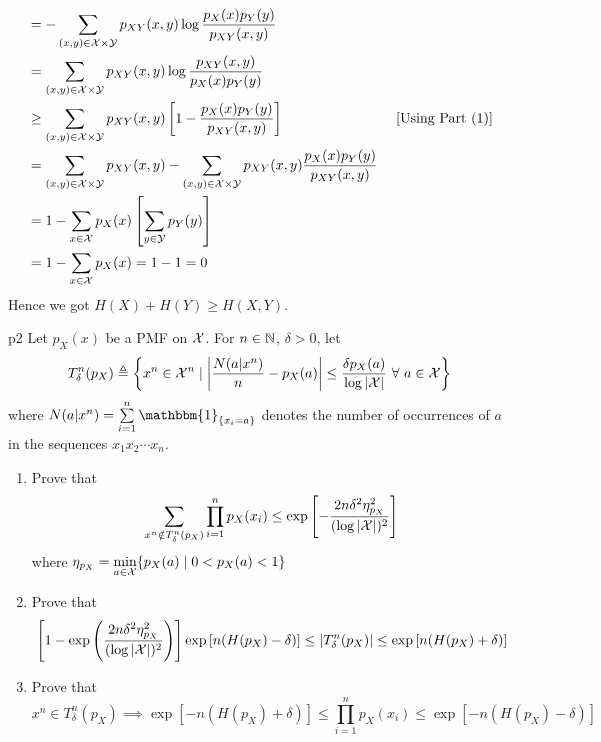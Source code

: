\documentclass[a4paper, 11pt]{article}
\begin{document}
{\begin{enumerate}
\begin{align*}
		                 & = -\sum_{(x,y)\in \mathcal{X}\times \mathcal{Y}}p_{XY}(x,y)\log \frac{p_X(x)p_Y(y)}{p_{XY}(x,y)}                                                                 \\
		                 & = \sum_{(x,y)\in \mathcal{X}\times \mathcal{Y}}p_{XY}(x,y)\log \frac{p_{XY}(x,y)}{p_X(x)p_Y(y)}                                                                  \\
		                 & \geq \sum_{(x,y)\in \mathcal{X}\times \mathcal{Y}}p_{XY}(x,y)\left[ 1-\frac{p_X(x)p_Y(y)}{p_{XY}(x,y)} \right] \qquad\qquad\qquad\qquad \left[\text{Using Part (1)}\right] \\
		                 & = \sum_{(x,y)\in \mathcal{X}\times \mathcal{Y}}p_{XY}(x,y) - \sum_{(x,y)\in \mathcal{X}\times \mathcal{Y}}p_{XY}(x,y)\frac{p_X(x)p_Y(y)}{p_{XY}(x,y)}                          \\
		                 & = 1-\sum_{x\in \mathcal{X}}p_X(x)\left[  \sum_{y\in \mathcal{Y}}p_Y(y)\right]                                                                                         \\
		                 & = 1-\sum_{x\in \mathcal{X}}p_X(x)=1-1=0
	\end{align*}
	Hence we got $H(X)+H(Y)\geq H(X,Y)$.
		\end{enumerate}
	}

\pagebreak
	
	
	\begin{problem}{%
	}{p2%
	}
	Let $p_X(x)$ be a PMF on $\mathcal{X}$. For $n\in \mathbb{N}$, $\delta>0$, let $$T_{\delta}^n(p_X)\triangleq \left\{ x^n\in \mathcal{X}^n\mid  \left| \frac{N(a|x^n)}{n}-p_X(a) \right| \leq \frac{\delta p_X(a)}{\log |\mathcal{X}|}\ \forall \ a\in \mathcal{X} \right\}$$ where $N(a|x^n)=\sum\limits_{i=1}^n\mathbbm{1}_{\{x_i=a\}}$ denotes the number of occurrences of $a$ in the sequences $x_1x_2\cdots x_n$.
	\begin{enumerate}
		\item Prove that $$\sum_{x^n\notin T_{\delta}^n(p_X)} \prod_{i=1}^n p_X(x_i)\leq \exp \left[ -\frac{2n\delta^2\eta^2_{p_X}}{(\log |\mathcal{X}|)^2} \right]$$ where $\eta_{p_X}=\min\limits_{a\in \mathcal{X}}\{p_X(a)\mid 0<p_X(a)<1\}$
		\item Prove that $$\left[1-   \exp \left( \frac{2n\delta^2\eta^2_{p_X}}{(\log |\mathcal{X}|)^2}  \right) \right] \exp\left[  n(H(p_X)-\delta)\right]\leq |T_{\delta}^n(p_X)|\leq \exp\left[n(H(p_X)+\delta)\right] $$
		\item Prove that $$x^n\in T_{\delta}^n(p_X)\implies \exp[-n(H(p_X)+\delta)]\leq \prod_{i=1}^np_X(x_i)\leq \exp[-n(H(p_X)-\delta)]$$
	\end{enumerate}
\end{problem}
\end{document}
